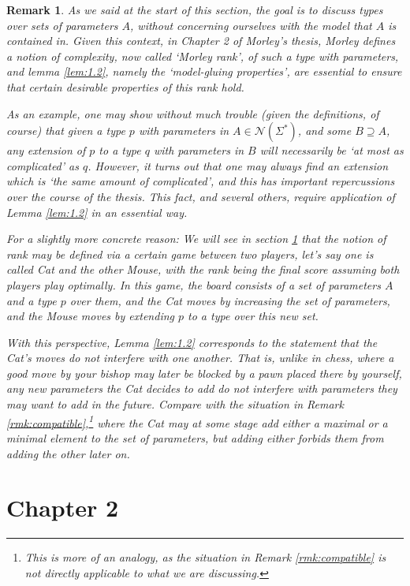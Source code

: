\documentclass{article}
\newtheorem{remark}[theorem]{Remark}
\theoremstyle{nonumberplain}
\newcommand{\calN}{\mathcal{N}}
\begin{document}
\begin{remark}
As we said at the start of this section, the goal is to discuss types over sets of parameters $A$, without concerning ourselves with the model that $A$ is contained in. Given this context, in Chapter 2 of Morley's thesis, Morley defines a notion of complexity, now called `Morley rank', of such a type with parameters, and lemma \ref{lem:1.2}, namely the `model-gluing properties', are essential to ensure that certain desirable properties of this rank hold.

As an example, one may show without much trouble (given the definitions, of course) that given a type $p$ with parameters in $A \in \calN(\Sigma^*)$, and some $B \supseteq A$, any extension of $p$ to a type $q$ with parameters in $B$ will necessarily be `at most as complicated' as $q$. However, it turns out that one may always find an extension which is `the same amount of complicated', and this has important repercussions over the course of the thesis. This fact, and several others, require application of Lemma \ref{lem:1.2} in an essential way.

For a slightly more concrete reason: We will see in section \ref{sec:ch2} that the notion of rank may be defined via a certain game between two players, let's say one is called Cat and the other Mouse, with the rank being the final score assuming both players play optimally. In this game, the board consists of a set of parameters $A$ and a type $p$ over them, and the Cat moves by increasing the set of parameters, and the Mouse moves by extending $p$ to a type over this new set.

With this perspective, Lemma \ref{lem:1.2} corresponds to the statement that the Cat's moves do not interfere with one another. That is, unlike in chess, where a good move by your bishop may later be blocked by a pawn placed there by yourself, any new parameters the Cat decides to add do not interfere with parameters they may want to add in the future. Compare with the situation in Remark \ref{rmk:compatible},\footnote{This is more of an analogy, as the situation in Remark \ref{rmk:compatible} is not directly applicable to what we are discussing.} where the Cat may at some stage add either a maximal or a minimal element to the set of parameters, but adding either forbids them from adding the other later on.
\end{remark}

\section{Chapter 2}\label{sec:ch2}
\end{document}
